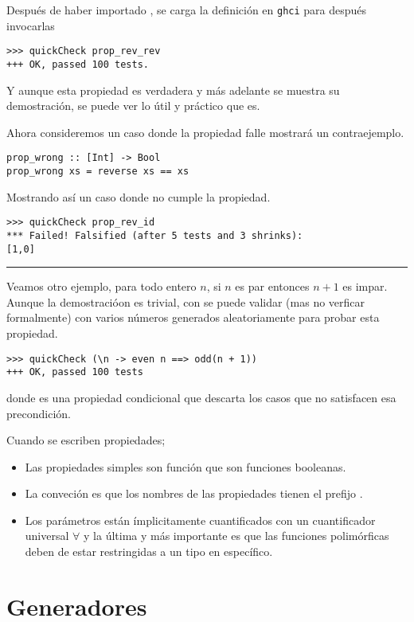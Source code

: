 Después de haber importado , se carga la definición en \texttt{ghci}
para después invocarlas
\begin{verbatim}
>>> quickCheck prop_rev_rev
+++ OK, passed 100 tests.
\end{verbatim}

Y aunque esta propiedad es verdadera y más adelante se muestra su demostración, se puede
ver lo útil y práctico que es.

Ahora consideremos un caso donde la propiedad falle \QuickCheck mostrará un contraejemplo.
\begin{verbatim}
prop_wrong :: [Int] -> Bool
prop_wrong xs = reverse xs == xs 
\end{verbatim}

Mostrando así un caso donde no cumple la propiedad.
\begin{verbatim}
>>> quickCheck prop_rev_id
*** Failed! Falsified (after 5 tests and 3 shrinks):
[1,0]
\end{verbatim}

\noindent\rule{\textwidth}{1pt}

Veamos otro ejemplo, para todo entero $n$, si $n$ es par entonces $n+1$ es impar. Aunque la
demostracióon es trivial, con \QuickCheck se puede validar (mas no verficar formalmente) con
varios números generados aleatoriamente para probar esta propiedad.
\begin{verbatim}
>>> quickCheck (\n -> even n ==> odd(n + 1))
+++ OK, passed 100 tests
\end{verbatim}

donde \hsCode{==>} es una propiedad condicional que descarta los casos que no satisfacen esa
precondición.

Cuando se escriben propiedades;
\begin{itemize}
\item Las propiedades simples son función que son funciones booleanas.
\item La conveción es que los nombres de las propiedades tienen el prefijo .
\item Los parámetros están ímplicitamente cuantificados con un cuantificador universal $\forall$ y
la última y más importante es que las funciones polimórficas deben de estar restringidas a un tipo
en específico.
\end{itemize}


\section{Generadores}

